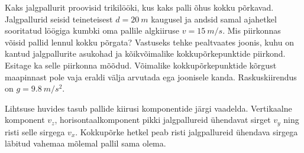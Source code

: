
Kaks jalgpallurit proovisid trikilööki, kus kaks palli õhus kokku põrkavad.
Jalgpallurid seisid teineteisest $d = \SI{20}{m}$ kaugusel ja andsid samal ajahetkel
sooritatud löögiga kumbki oma pallile algkiiruse $v = \SI{15}{m/s}$. Mis piirkonnas võisid pallid lennul kokku põrgata?
Vastuseks tehke pealtvaates joonis, kuhu on kantud jalgpallurite
asukohad ja kõikvõimalike kokkupõrkepunktide piirkond. Esitage ka selle
piirkonna mõõdud. Võimalike kokkupõrkepunktide kõrgust maapinnast pole
vaja eraldi välja arvutada ega joonisele kanda. Raskuskiirendus
on $g = \SI{9,8}{m/s^2}$. 

\hint
Lihtsuse huvides tasub pallide kiirusi komponentide järgi vaadelda. Vertikaalne komponent $v_z$, horisontaalkomponent pikki jalgpallureid ühendavat sirget $v_y$ ning risti selle sirgega $v_x$. Kokkupõrke hetkel peab risti jalgpallureid ühendava sirgega läbitud vahemaa mõlemal pallil sama olema.

